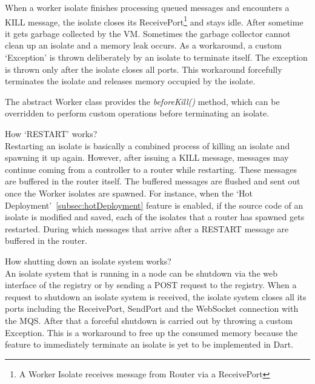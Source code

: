 \begin{description}
    When a worker isolate finishes processing queued messages and encounters a KILL message, the isolate closes its ReceivePort\footnote{A Worker Isolate receives message from Router via a ReceivePort} and stays idle. After sometime it gets garbage collected by the VM. Sometimes the garbage collector cannot clean up an isolate and a memory leak occurs. As a workaround, a custom ‘Exception’ is thrown deliberately by an isolate to terminate itself. The exception is thrown only after the isolate closes all ports. This workaround forcefully terminates the isolate and releases memory occupied by the isolate.

    The abstract Worker class provides the \emph{beforeKill()} method, which can be overridden to perform custom operations before terminating an isolate.

    \item How ‘RESTART’ works?\\
    Restarting an isolate is basically a combined process of killing an isolate and spawning it up again. However, after issuing a KILL message, messages may continue coming from a controller to a router while restarting. These messages are buffered in the router itself. The buffered messages are flushed and sent out once the Worker isolates are spawned. For instance, when the ‘Hot Deployment’~\autoref{subsec:hotDeployment} feature is enabled, if the source code of an isolate is modified and saved, each of the isolates that a router has spawned gets restarted. During which messages that arrive after a RESTART message are buffered in the router.

    \item How shutting down an isolate system works?\\
    An isolate system that is running in a node can be shutdown via the web interface of the registry or by sending a POST request to the registry. When a request to shutdown an isolate system is received, the isolate system closes all its ports including the ReceivePort, SendPort and the WebSocket connection with the MQS. After that a forceful shutdown is carried out by throwing a custom Exception. This is a workaround to free up the consumed memory because the feature to immediately terminate an isolate is yet to be implemented in Dart.
  \end{description}


